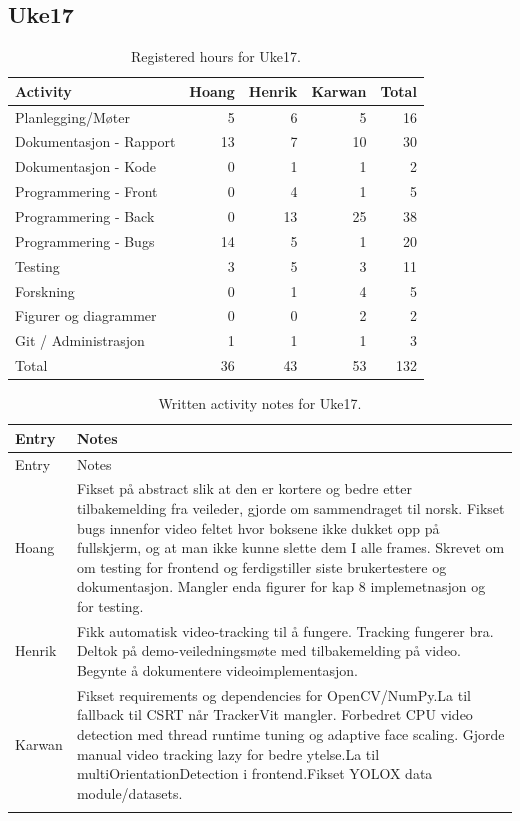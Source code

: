 \subsection{Uke17}

\begin{table}[H]
\centering
\small
\caption{Registered hours for Uke17.}
\label{tab:project-hours-uke17}
\begin{tabular}{lrrrr}
\toprule
Activity & Hoang & Henrik & Karwan & Total \\
\midrule
Planlegging/Møter & 5 & 6 & 5 & 16 \\
Dokumentasjon - Rapport & 13 & 7 & 10 & 30 \\
Dokumentasjon - Kode & 0 & 1 & 1 & 2 \\
Programmering - Front & 0 & 4 & 1 & 5 \\
Programmering - Back & 0 & 13 & 25 & 38 \\
Programmering - Bugs & 14 & 5 & 1 & 20 \\
Testing & 3 & 5 & 3 & 11 \\
Forskning & 0 & 1 & 4 & 5 \\
Figurer og diagrammer & 0 & 0 & 2 & 2 \\
Git / Administrasjon & 1 & 1 & 1 & 3 \\
\midrule
Total & 36 & 43 & 53 & 132 \\
\bottomrule
\end{tabular}
\end{table}

\begin{longtable}{p{}p{}}
\caption{Written activity notes for Uke17.}\\
\toprule
Entry & Notes \\
\midrule
\endfirsthead
\toprule
Entry & Notes \\
\midrule
\endhead
Hoang & Fikset på abstract slik at den er kortere og bedre etter tilbakemelding fra veileder, gjorde om sammendraget til norsk. Fikset bugs innenfor video feltet hvor boksene ikke dukket opp på fullskjerm, og at man ikke kunne slette dem I alle frames. Skrevet om om testing for frontend og ferdigstiller siste brukertestere og dokumentasjon. Mangler enda figurer for kap 8 implemetnasjon og for testing. \\
\addlinespace
Henrik & Fikk automatisk video-tracking til å fungere. Tracking fungerer bra. Deltok på demo-veiledningsmøte med tilbakemelding på video. Begynte å dokumentere videoimplementasjon. \\
\addlinespace
Karwan & Fikset requirements og dependencies for OpenCV/NumPy.\newline La til fallback til CSRT når TrackerVit mangler. Forbedret CPU video detection med thread runtime tuning og adaptive face scaling. Gjorde manual video tracking lazy for bedre ytelse.\newline La til multiOrientationDetection i frontend.\newline Fikset YOLOX data module/datasets. \\
\addlinespace
\bottomrule
\end{longtable}

